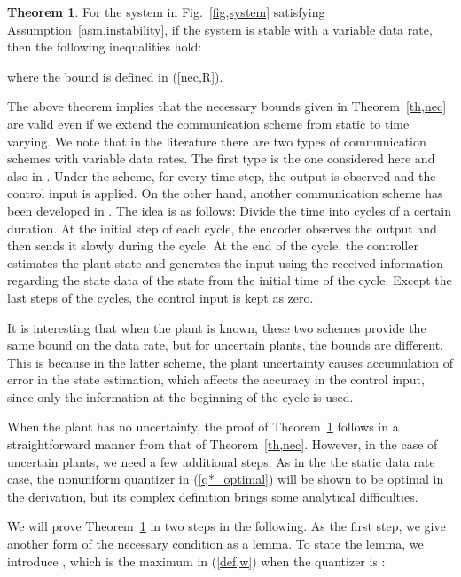 \documentclass[a4paper, 11pt]{article}
\theoremstyle{definition}
\newtheorem{thm}{Theorem}
\newcommand{\fref}[1]{Fig.~\ref{#1}}
\begin{document}
\begin{thm}\label{th,necm}
 For the system in \fref{fig,system} satisfying Assumption~\ref{asm,instability},
if the system is stable with a variable data rate, then the following inequalities
hold:

where the bound  is defined in (\ref{nec,R}).
\end{thm}

The above theorem implies that the necessary bounds given in Theorem~\ref{th,nec}
are valid even if we extend the communication scheme from static to time varying.
We note that in the literature there are two types of communication schemes with
variable data rates.
The first type is the one considered here and also in \cite{Tatikonda2004}.
Under the scheme, for every time step, the output is observed and the
control input is applied.
On the other hand, another communication scheme has been developed in
\cite{Nair2004, You2010, Okano2012}.
The idea is as follows:
Divide the time into cycles of a certain duration.
At the initial step of each cycle, the encoder observes the output and
then sends it slowly during the cycle.
At the end of the cycle, the controller estimates the plant state
and generates the input using the received information regarding the state
data of the state from the initial time of the cycle.
Except the last steps of the cycles, the control input is kept as zero.

It is interesting that when the plant is known, these two schemes
provide the same bound on the data rate, but for uncertain plants, the bounds
are different.
This is because in the latter scheme, the plant uncertainty causes
accumulation of error in the state estimation, which affects the accuracy
in the control input, since only the information at the beginning of the
cycle is used.

When the plant has no uncertainty, the proof of Theorem~\ref{th,necm} follows
in a straightforward manner from that of Theorem~\ref{th,nec}.
However, in the case of uncertain plants, we need a few additional steps.
As in the the static data rate case, the nonuniform quantizer  in
(\ref{q*_optimal}) will be shown to be optimal in the derivation, but its
complex definition brings some analytical difficulties.

We will prove Theorem~\ref{th,necm} in two steps in the following.
As the first step, we give another form of the necessary condition as a lemma.
To state the lemma, we introduce , which is the maximum  in (\ref{def,w})
when the quantizer is :
\end{document}
